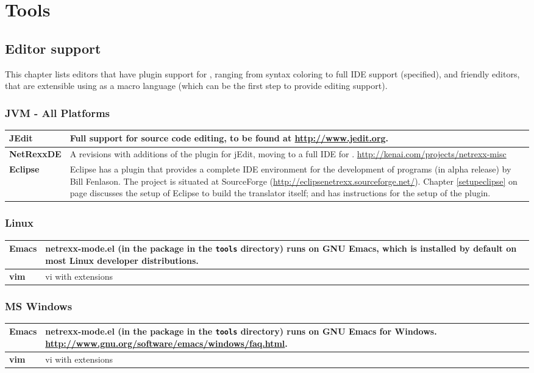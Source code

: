 \chapter{\nr{}Tools}
\section{Editor support}\label{editors}
This chapter lists editors that have plugin support for \nr{},
ranging from syntax coloring to full IDE support (specified), and
\Rexx{} friendly editors, that are extensible using \Rexx{} as a macro
language (which can be the first step to provide \nr{} editing support).
\subsection{JVM - All Platforms}
\begin{tabularx}{\textwidth}{>{\bfseries}lX}
\toprule
JEdit & Full support for \nr{} source code editing, to be found at
\url{http://www.jedit.org}.
\\\midrule
NetRexxDE & A revisions with additions of the \nr{} plugin for
jEdit, moving to a full IDE for \nr{}. \url{http://kenai.com/projects/netrexx-misc} 
\\\midrule
Eclipse & Eclipse has a \nr{} plugin that provides a complete IDE
environment for the development of \nr{} programs (in alpha release)
by Bill Fenlason. The project is situated at SourceForge
(\url{http://eclipsenetrexx.sourceforge.net/}). Chapter
\ref{setupeclipse} on page \pageref{setupeclipse} discusses the setup
of Eclipse to build the translator itself; and has
instructions for the setup of the \nr{} plugin.
\\\bottomrule
\end{tabularx}
\subsection{Linux}
\begin{tabularx}{\textwidth}{>{\bfseries}lX}
\toprule
Emacs & netrexx-mode.el (in the \nr{} package in the \texttt{tools}
directory) runs on GNU Emacs, which is installed by default on most
Linux developer distributions.
\\\midrule
vim & vi with extensions
\\\bottomrule
\end{tabularx}
\subsection{MS Windows}
\begin{tabularx}{\textwidth}{>{\bfseries}lX}
\toprule
Emacs & netrexx-mode.el (in the \nr{} package in the \texttt{tools} directory) runs on GNU Emacs for
Windows. \url{http://www.gnu.org/software/emacs/windows/faq.html}.
\\\midrule
vim & vi with extensions
\\\bottomrule
\end{tabularx}
